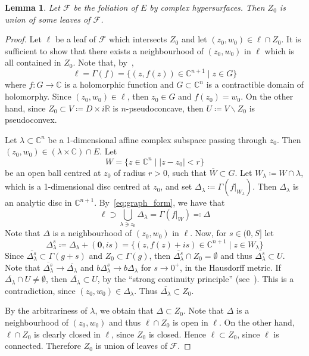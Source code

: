 \documentclass[reqno,oneside]{amsart}
\newcommand{\numberset}{\mathbb}
\newcommand{\R}{\numberset{R}}
\newcommand{\C}{\numberset{C}}
\renewcommand{\vec}{\boldsymbol}
\theoremstyle{definition}
\theoremstyle{plain}
\newtheorem{lemma}[definition]{Lemma}
\theoremstyle{remark}
\begin{document}
\begin{lemma}
	Let $\mathcal{F}$ be the foliation of $E$ by complex hypersurfaces. Then $Z_0$ is union of some leaves of $\mathcal{F}$.
\end{lemma}
\begin{proof}
	Let $\ell$ be a leaf of $\mathcal{F}$ which intersects $Z_0$ and let $(z_0,w_0)\in\ell\cap Z_0$. It is sufficient to show that there exists a neighbourhood of $(z_0,w_0)$ in $\ell$ which is all contained in $Z_0$. Note that, by~\cite[Theorem~2]{chirka:trepreau_theorem}, 
	\begin{equation}
	\label{eq:graph_form}
		\ell=\Gamma(f)=\{(z,f(z))\in\C^{n+1} \mid z\in G\}
	\end{equation}
	where $f:G\to\C$ is a holomorphic function and $G\subset\C^n$ is a contractible domain of holomorphy. Since $(z_0,w_0)\in\ell$, then $z_0\in G$ and $f(z_0)=w_0$. On the other hand, since $Z_0\subset V\coloneqq D\times i\R$ is $n$-pseudoconcave, then $U\coloneqq V\smallsetminus Z_0$ is pseudoconvex.

	Let $\lambda\subset\C^n$ be a 1-dimensional affine complex subspace passing through $z_0$. Then $(z_0,w_0)\in(\lambda\times\C)\cap E$. Let
	\[
		W=\{z\in\C^n \mid |z-z_0|<r\}
	\]
	be an open ball centred at $z_0$ of radius $r>0$, such that $\overline{W}\subset G$. Let $W_\lambda\coloneqq W\cap\lambda$, which is a 1-dimensional disc centred at $z_0$, and set $\Delta_\lambda\coloneqq\Gamma(f|_{W_\lambda})$. Then $\Delta_\lambda$ is an analytic disc in $\C^{n+1}$. By~\eqref{eq:graph_form}, we have that
	\[
		\ell\supset\bigcup_{\lambda\ni z_0} \Delta_\lambda=\Gamma(f|_W)\eqqcolon \Delta
	\]
	Note that $\Delta$ is a neighbourhood of $(z_0,w_0)$ in $\ell$. Now, for $s\in(0,S]$ let
	\[
		\Delta_\lambda^s\coloneqq\Delta_\lambda+(\vec{0},is)=\{(z,f(z)+is)\in\C^{n+1} \mid z\in W_\lambda\}
	\]
	Since $\overline{\Delta_\lambda^s}\subset\Gamma(g+s)$ and $Z_0\subset\Gamma(g)$, then $\overline{\Delta_\lambda^s}\cap Z_0=\emptyset$ and thus $\overline{\Delta_\lambda^s}\subset U$. Note that $\overline{\Delta_\lambda^s}\to\overline{\Delta_\lambda}$ and $b\Delta_\lambda^s\to b\Delta_\lambda$ for $s\to0^+$, in the Hausdorff metric. If $\overline{\Delta_\lambda}\cap U\neq\emptyset$, then $\overline{\Delta_\lambda}\subset U$, by the ``strong continuity principle'' (see~\cite[Section~17.3]{vladimirov:methods}). This is a contradiction, since $(z_0,w_0)\in \Delta_\lambda$. Thus $\overline{\Delta_\lambda}\subset Z_0$.

	By the arbitrariness of $\lambda$, we obtain that $\Delta\subset Z_0$. Note that $\Delta$ is a neighbourhood of $(z_0,w_0)$ and thus $\ell\cap Z_0$ is open in $\ell$. On the other hand, $\ell\cap Z_0$ is clearly closed in $\ell$, since $Z_0$ is closed. Hence $\ell\subset Z_0$, since $\ell$ is connected. Therefore $Z_0$ is union of leaves of $\mathcal{F}$.
\end{proof}
\end{document}
